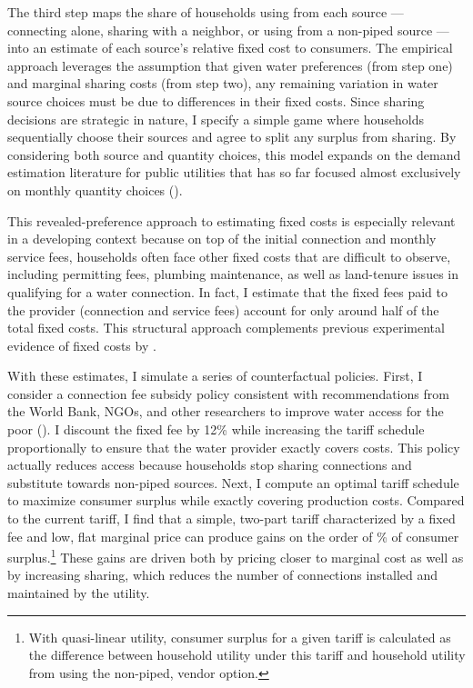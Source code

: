 \documentclass[12pt]{article}
\begin{document}
The third step maps the share of households using from each source --- connecting alone, sharing with a neighbor, or using from a non-piped source --- into an estimate of each source's relative fixed cost to consumers.  The empirical approach leverages the assumption that given water preferences (from step one) and marginal sharing costs (from step two), any remaining variation in water source choices must be due to differences in their fixed costs.  Since sharing decisions are strategic in nature, I specify a simple game where households sequentially choose their sources and agree to split any surplus from sharing.  By considering both source and quantity choices, this model expands on the demand estimation literature for public utilities that has so far focused almost exclusively on monthly quantity choices (\cite{diakite2009proposal,mcrae2014infrastructure,olmstead2009reduced,szabo2015value}).  

This revealed-preference approach to estimating fixed costs is especially relevant in a developing context because on top of the initial connection and monthly service fees, households often face other fixed costs that are difficult to observe, including permitting fees, plumbing maintenance, as well as land-tenure issues in qualifying for a water connection.  In fact, I estimate that the fixed fees paid to the provider (connection and service fees) account for only around half of the total fixed costs.  This structural approach complements previous experimental evidence of fixed costs by \cite{devoto2012happiness}.  



With these estimates, I simulate a series of counterfactual policies.  First, I consider a connection fee subsidy policy consistent with recommendations from the World Bank, NGOs, and other researchers to improve water access for the poor (\cite{komives2005water,jimenez2014factors,mcintosh2003asian}).  I discount the fixed fee by 12\% while increasing the tariff schedule proportionally to ensure that the water provider exactly covers costs.  This policy actually reduces access because households stop sharing connections and substitute towards non-piped sources.  Next, I compute an optimal tariff schedule to maximize consumer surplus while exactly covering production costs.  Compared to the current tariff, I find that a simple, two-part tariff characterized by a fixed fee and low, flat marginal price can produce gains on the order of \unskip\% of consumer surplus.\footnote{With quasi-linear utility, consumer surplus for a given tariff is calculated as the difference between household utility under this tariff and household utility from using the non-piped, vendor option.}  These gains are driven both by pricing closer to marginal cost as well as by increasing sharing, which reduces the number of connections installed and maintained by the utility.  
\end{document}

